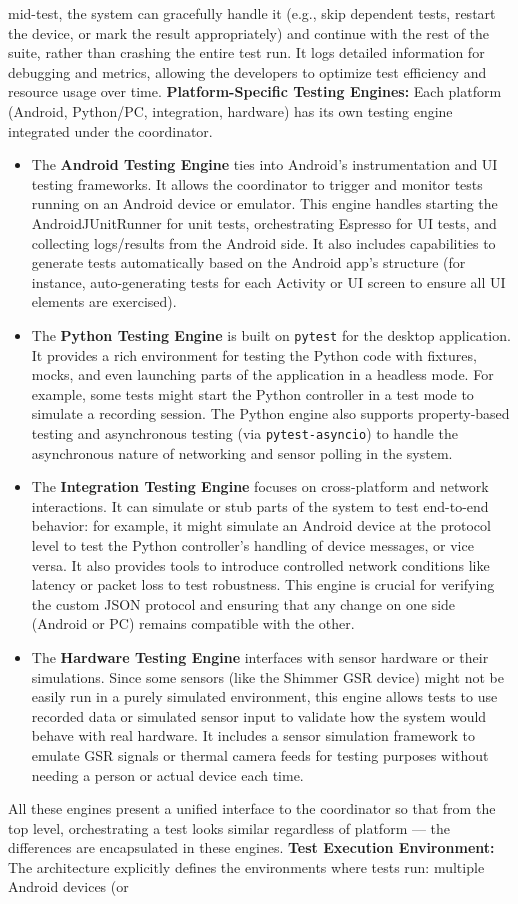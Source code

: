 mid-test, the system can gracefully handle it (e.g., skip dependent tests, restart the device, or mark the result appropriately) and continue with the rest of the suite, rather than crashing the entire test run. It logs detailed information for debugging and metrics, allowing the developers to optimize test efficiency and resource usage over time. \textbf{Platform-Specific Testing Engines:} Each platform (Android, Python/PC, integration, hardware) has its own testing engine integrated under the coordinator. \begin{itemize} \item The \textbf{Android Testing Engine} ties into Android's instrumentation and UI testing frameworks. It allows the coordinator to trigger and monitor tests running on an Android device or emulator. This engine handles starting the AndroidJUnitRunner for unit tests, orchestrating Espresso for UI tests, and collecting logs/results from the Android side. It also includes capabilities to generate tests automatically based on the Android app's structure (for instance, auto-generating tests for each Activity or UI screen to ensure all UI elements are exercised). \item The \textbf{Python Testing Engine} is built on \texttt{pytest} for the desktop application. It provides a rich environment for testing the Python code with fixtures, mocks, and even launching parts of the application in a headless mode. For example, some tests might start the Python controller in a test mode to simulate a recording session. The Python engine also supports property-based testing and asynchronous testing (via \texttt{pytest-asyncio}) to handle the asynchronous nature of networking and sensor polling in the system. \item The \textbf{Integration Testing Engine} focuses on cross-platform and network interactions. It can simulate or stub parts of the system to test end-to-end behavior: for example, it might simulate an Android device at the protocol level to test the Python controller's handling of device messages, or vice versa. It also provides tools to introduce controlled network conditions like latency or packet loss to test robustness. This engine is crucial for verifying the custom JSON protocol and ensuring that any change on one side (Android or PC) remains compatible with the other. \item The \textbf{Hardware Testing Engine} interfaces with sensor hardware or their simulations. Since some sensors (like the Shimmer GSR device) might not be easily run in a purely simulated environment, this engine allows tests to use recorded data or simulated sensor input to validate how the system would behave with real hardware. It includes a sensor simulation framework to emulate GSR signals or thermal camera feeds for testing purposes without needing a person or actual device each time. \end{itemize} All these engines present a unified interface to the coordinator so that from the top level, orchestrating a test looks similar regardless of platform --- the differences are encapsulated in these engines. \textbf{Test Execution Environment:} The architecture explicitly defines the environments where tests run: multiple Android devices (or 